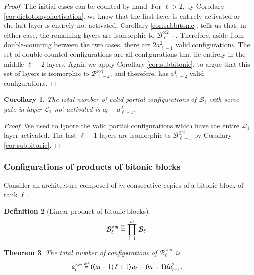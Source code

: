 \documentclass[11pt,letterpaper]{article}
\newtheorem{theorem}{Theorem}[section]
\newtheorem{corollary}[theorem]{Corollary}
\theoremstyle{definition}
\newtheorem{definition}[theorem]{Definition}
\theoremstyle{remark}
\newcommand{\defeq}{\stackrel{\mbox{\normalfont\tiny def}}=}
\newcommand{\cB}{\mathcal B}
\newcommand{\cL}{\mathcal L}
\numberwithin{equation}{section}
\theoremstyle{definition}
\begin{document}
\begin{proof}
The initial cases can be counted by hand. For $\ell > 2$, by Corollary \ref{cor:dictotomyofactivation}, we know that the first layer is entirely activated or the last layer is entirely not activated. Corollary \ref{cor:subbitonic}, tells us that, in either case, the remaining layers are isomorphic to $\cB_{\ell - 1}^{\otimes 2}$. Therefore, aside from double-counting between the two cases, there are $2a_{\ell - 1}^2$ valid configurations. The set of double counted configurations are all configurations that lie entirely in the middle $\ell - 2$ layers. Again we apply Corollary \ref{cor:subbitonic}, to argue that this set of layers is isomorphic to $\cB_{\ell - 2}^{\otimes 4}$, and therefore, has $a_{\ell - 2}^4$ valid configurations.
\end{proof}

\begin{corollary}
The total number of valid partial configurations of $\cB_\ell$ with some gate in layer $\cL_1$ not activated is $a_\ell - a_{\ell - 1}^2$.
\label{cor:gatenotactivated}
\end{corollary}

\begin{proof}
We need to ignore the valid partial configurations which have the entire $\cL_1$ layer activated. The last $\ell - 1$ layers are isomorphic to $\cB_{\ell - 1}^{\otimes 2}$ by Corollary \ref{cor:subbitonic}.
\end{proof}

%
%

%

%
%
%
%
%
%


%

\subsubsection{Configurations of products of bitonic blocks}
\label{subsec:countingconfigsofproducts}

Consider an architecture composed of $m$ consecutive copies of a bitonic block of rank $\ell$.
\begin{definition}[Linear product of bitonic blocks]
\begin{equation}
\cB_\ell^{\times m} \defeq \prod_{i = 1}^m \cB_\ell.
\end{equation}
\label{def:linearproduct}
\end{definition}

\begin{theorem}
The total number of configurations of $\cB_\ell^{\times m}$ is
\begin{equation}
a_\ell^{\times m} \defeq \left(\left(m-1\right)\ell+1\right)a_\ell-(m-1)\ell a_{\ell-1}^2.
\end{equation}
\label{thm:configcountprod}
\end{theorem}
\end{document}
